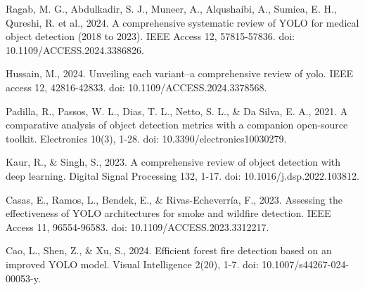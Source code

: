 \begin{thebibliography}{9}
  Ragab, M. G., Abdulkadir, S. J., Muneer, A., Alqushaibi, A.,
  Sumiea, E. H., Qureshi, R. et al., 2024. A
  comprehensive systematic review of YOLO for medical object
  detection (2018 to 2023). IEEE Access 12, 57815-57836. doi:
  10.1109/ACCESS.2024.3386826.

  Hussain, M., 2024. Unveiling each variant–a comprehensive review of
  yolo. IEEE access 12, 42816-42833. doi: 10.1109/ACCESS.2024.3378568.

  Padilla, R., Passos, W. L., Dias, T. L., Netto, S. L., \& Da Silva,
  E. A., 2021. A comparative analysis of object detection metrics
  with a companion open-source toolkit. Electronics 10(3), 1-28. doi:
  10.3390/electronics10030279.

  Kaur, R., \& Singh, S., 2023. A comprehensive review of object
  detection with deep learning. Digital Signal Processing 132, 1-17.
  doi: 10.1016/j.dsp.2022.103812.

  Casas, E., Ramos, L., Bendek, E., \& Rivas-Echeverría, F., 2023.
  Assessing the effectiveness of YOLO architectures for smoke and
  wildfire detection. IEEE Access 11, 96554-96583. doi:
  10.1109/ACCESS.2023.3312217.

  Cao, L., Shen, Z., \& Xu, S., 2024. Efficient forest fire detection
  based on an improved YOLO model. Visual Intelligence 2(20), 1-7.
  doi: 10.1007/s44267-024-00053-y.

\end{thebibliography}
